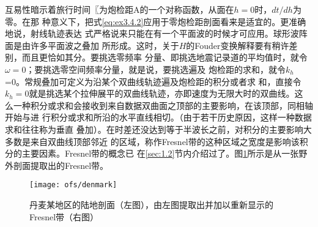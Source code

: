 互易性暗示着旅行时间〖为炮检距A的一个对称函数，从面在$h=0$时，$dt/dh$为零。在那
种意义下，把式\ref{eq:ex3.4.2}应用于零炮检距剖面看来是适宜的。更准确地说，射线轨迹表达
式严格说来只能在有一个平面波的时候才可应用。球形波阵面是由许多平面波之叠加
所形成。这时，关于$H$的Fouder变换解释要有稍许差别，而且更恰如其分。要挑选零频率
分量、即挑选地震记录道的平均值时，就令$\omega=0$；要挑选零空间频率分量，就是说，要挑选遍及
炮检距的求和，就令$k_h$=0。常规叠加可定义为沿某个双曲线轨迹遍及炮检距的积分或者求
和，直接令$k_h=0$就是挑选某个拉伸展平的双曲线轨迹，亦即速度为无限大时的双曲线。这
么一种积分或求和会接收到来自数据双曲面之顶部的主要影响，在该顶部，同相轴开始与进
行积分或求和所沿的水平直线相切。（由于若干历史原因，这样一种数据求和往往称为垂直
叠加）。在时差还没达到等于半波长之前，对积分的主要影响大多数是来自双曲线顶部邻近
的区域，称作Fresnel带的这种区域之宽度是影响该积分的主要因素。Fresnel带的概念已
在\ref{sec:1.2}节内介绍过了。图\ref{fig:ofs/denmark}所示是从一张野外剖面提取出的Fresnel带。

\begin{figure}[H]
\centering
\texttt{[image: ofs/denmark]}
\caption[denmark]{丹麦某地区的陆地剖面（左图），由左图提取出并加以重新显示的
Fresnel带（右图）}
\label{fig:ofs/denmark}
\end{figure}
